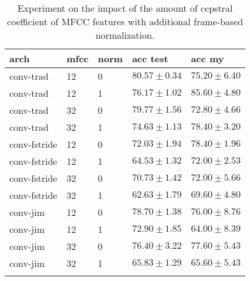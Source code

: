 \begin{table}[ht!]
\begin{center}
\caption{Experiment on the impact of the amount of cepstral coefficient of MFCC features with additional frame-based normalization.}
\begin{tabular}{ M{3cm}  M{2cm}  M{2cm}  M{2.5cm}  M{2.5cm} }
\toprule
\textbf{arch} & \textbf{mfcc} & \textbf{norm} & \textbf{acc test} & \textbf{acc my} \\
\midrule
conv-trad & 12 & 0 & $80.57 \pm 0.34$ & $75.20 \pm 6.40$ \\
conv-trad & 12 & 1 & $76.17 \pm 1.02$ & $85.60 \pm 4.80$ \\
conv-trad & 32 & 0 & $79.77 \pm 1.56$ & $72.80 \pm 4.66$ \\
conv-trad & 32 & 1 & $74.63 \pm 1.13$ & $78.40 \pm 3.20$ \\
\midrule
conv-fstride & 12 & 0 & $72.03 \pm 1.94$ & $78.40 \pm 1.96$ \\
conv-fstride & 12 & 1 & $64.53 \pm 1.32$ & $72.00 \pm 2.53$ \\
conv-fstride & 32 & 0 & $70.73 \pm 1.42$ & $72.00 \pm 5.66$ \\
conv-fstride & 32 & 1 & $62.63 \pm 1.79$ & $69.60 \pm 4.80$ \\
\midrule
conv-jim & 12 & 0 & $78.70 \pm 1.38$ & $76.00 \pm 8.76$ \\
conv-jim & 12 & 1 & $72.90 \pm 1.85$ & $64.00 \pm 8.39$ \\
conv-jim & 32 & 0 & $76.40 \pm 3.22$ & $77.60 \pm 5.43$ \\
conv-jim & 32 & 1 & $65.83 \pm 1.29$ & $65.60 \pm 5.43$ \\
\bottomrule
\label{tab:exp_fs_cepstral_l12}
\end{tabular}
\end{center}
\vspace{-4mm}
\end{table}
\FloatBarrier
\noindent